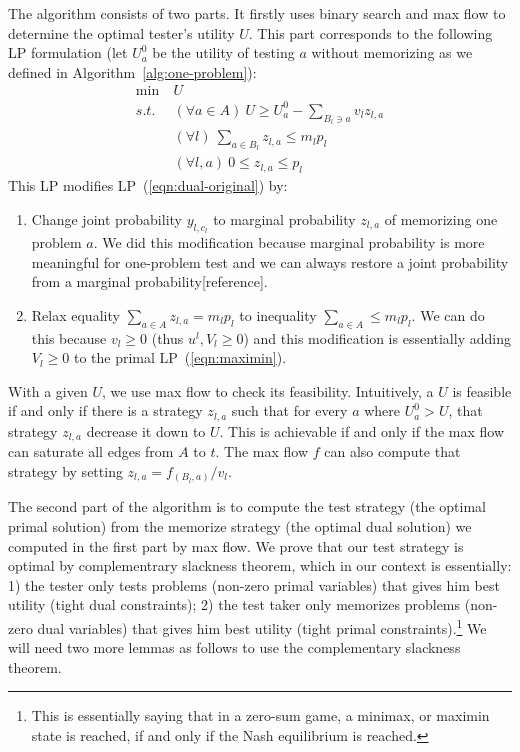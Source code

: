 \documentclass{article}
\begin{document}
The algorithm consists of two parts. It firstly uses binary search and max flow
to determine the optimal tester's utility $U$.  This part corresponds to the following
LP formulation (let $U^0_a$ be the utility of testing $a$ without memorizing as we defined
in Algorithm~\ref{alg:one-problem}):
\begin{align}\label{eqn:one-problem}
	\min~ &U\\
	s.t.~ &(\forall a \in A)~ U \geq U^0_a - \sum_{B_l \ni a} v_l z_{l, a}\nonumber\\
	&(\forall l)~ \sum_{a \in B_l} z_{l, a} \leq m_l p_l\nonumber\\
	&(\forall l, a)~ 0 \leq z_{l, a} \leq p_l\nonumber
\end{align}
This LP modifies LP~(\ref{eqn:dual-original}) by:
\begin{enumerate}
	\item Change joint probability $y_{l, c_l}$ to marginal probability
	$z_{l, a}$ of memorizing one problem $a$.  We did this modification
	because marginal probability is more meaningful for one-problem test
	and we can always restore a joint probability from a marginal
	probability[reference].
	\item Relax equality $\sum_{a \in A} z_{l, a} = m_l p_l$ to inequality $\sum_{a \in A} \leq m_l p_l$. 
	We can do this because $v_l \geq 0$ (thus $u^l, V_l \geq 0$) and this modification
	is essentially adding $V_l \geq 0$ to the primal LP~(\ref{eqn:maximin}).
\end{enumerate}
With a given $U$, we use max flow to check its feasibility. Intuitively, a $U$
is feasible if and only if there is a strategy $z_{l, a}$ such that for every
$a$ where $U^0_a > U$, that strategy $z_{l, a}$ decrease it down to $U$. This
is achievable if and only if the max flow can saturate all edges from $A$ to
$t$. The max flow $f$ can also compute that strategy by setting $z_{l, a} =
f_{(B_l, a)}/v_l$.

The second part of the algorithm is to compute the test strategy (the optimal
primal solution) from the memorize strategy (the optimal dual solution) we
computed in the first part by max flow. We prove that our test strategy is
optimal by complementrary slackness theorem, which in our context is
essentially: 1) the tester only tests problems (non-zero primal variables)
that gives him best utility (tight dual constraints); 2) the test taker only
memorizes problems (non-zero dual variables) that gives him best utility
(tight primal constraints).\footnote{This is essentially saying that in a
zero-sum game, a minimax, or maximin state is reached, if and only if the Nash
equilibrium is reached.} We will need two more lemmas as follows to use the
complementary slackness theorem.
\end{document}
